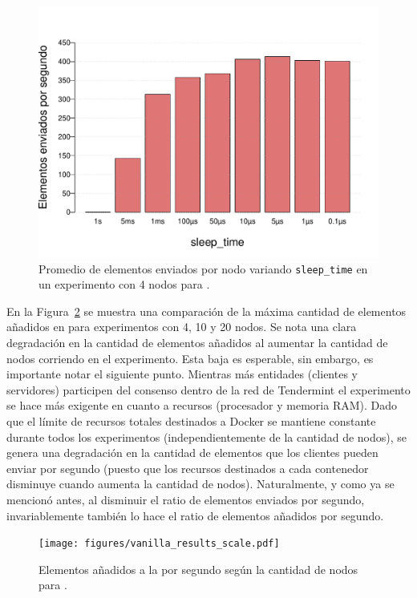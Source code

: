 \begin{figure}
	\centering
	\includegraphics[scale=0.5]{figures/sleep_time_2.pdf}
	\caption{Promedio de elementos enviados por nodo variando \texttt{sleep\_time} en un experimento con 4 nodos para \vanilla.}
	\label{fig:elements_against_sleep_time}
\end{figure}

En la Figura~\ref{fig:vanilla_results} se muestra una comparación de la máxima cantidad de elementos añadidos en \vanilla para experimentos con
4, 10 y 20 nodos.
%
Se nota una clara degradación en la cantidad de elementos añadidos al aumentar la cantidad de nodos corriendo en el experimento.
Esta baja es esperable, sin embargo, es importante notar el siguiente punto.
Mientras más entidades (clientes y servidores) participen del consenso dentro de la red de Tendermint el experimento se hace más
exigente en cuanto a recursos (procesador y memoria RAM).
Dado que el límite de recursos totales destinados a Docker se mantiene constante durante todos los experimentos
(independientemente de la cantidad de nodos),
se genera una degradación en la cantidad de elementos que los clientes pueden enviar por segundo
(puesto que los recursos destinados a cada contenedor disminuye cuando aumenta la cantidad de nodos).
Naturalmente, y como ya se mencionó antes, al disminuir el ratio de elementos enviados por segundo, invariablemente también lo hace el ratio de
elementos añadidos por segundo.

\begin{figure}
	\centering
	\texttt{[image: figures/vanilla\_results\_scale.pdf]}
	\caption{Elementos añadidos a la \setchain por segundo según la cantidad de nodos para \vanilla.}
	\label{fig:vanilla_results}
\end{figure}

